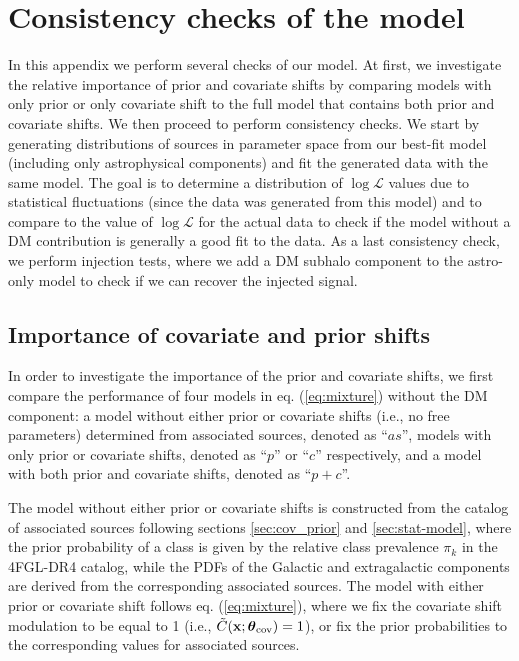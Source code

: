 \documentclass[12pt, a4paper]{article}
\newcommand{\bx}{{\bf x}}
\newcommand{\btheta}{\boldsymbol{\theta}}
\begin{document}
\section{Consistency checks of the model}
\label{app:MC}


In this appendix we perform several checks of our model.
At first, we investigate the relative importance of prior and covariate shifts by comparing models with only prior or only covariate shift to the full model that contains both prior and covariate shifts. 
We then proceed to perform consistency checks. We start by generating distributions of sources in parameter space from our best-fit model (including only astrophysical components) and fit the generated data with the same model.
The goal is to determine a distribution of $\log\mathcal{L}$ values due to statistical fluctuations (since the data was generated from this model) and to compare to the value of $\log\mathcal{L}$ for the actual data to check if the model without a DM contribution is generally a good fit to the data.
As a last consistency check, we perform injection tests, where we add a DM subhalo component to the astro-only model to check if we can recover the injected signal.

\subsection{Importance of covariate and prior shifts}
\label{app:prior_vs_cov}

In order to investigate the importance of the prior and covariate shifts, 
we first compare the performance of four models in eq. (\ref{eq:mixture}) without the DM component: a model without either prior or covariate shifts (i.e., no free parameters) determined from associated sources, denoted as ``$as$'', models with only prior or covariate shifts, denoted as ``$p$'' or ``$c$'' respectively, and a model with both prior and covariate shifts, denoted as ``$p+c$''. 

The model without either prior or covariate shifts is constructed from the catalog of associated sources following sections \ref{sec:cov_prior} and \ref{sec:stat-model}, where the prior probability of a class is given by the relative class prevalence $\pi_k$ in the 4FGL-DR4 catalog, while the PDFs of the Galactic and extragalactic components are derived from the corresponding associated sources.
The model with either prior or covariate shift follows eq. (\ref{eq:mixture}), 
where we fix the covariate shift modulation to be equal to 1 (i.e., $\tilde{C}(\bx; \btheta_{\rm cov}) = 1$), or fix the prior probabilities to the corresponding values for associated sources.
\end{document}
